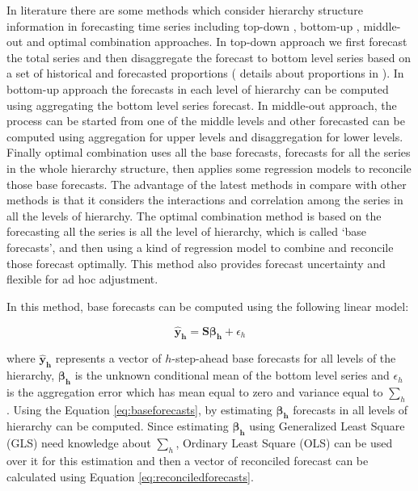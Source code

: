 \documentclass[11pt,a4paper,]{article}
\begin{document}
In literature there are some methods which consider hierarchy structure
information in forecasting time series including top-down
\autocite{gross1990disaggregation}, bottom-up
\autocite{kahn1998revisiting}, middle-out and optimal combination
\autocite{hyndman2011optima} approaches. In top-down approach we first
forecast the total series and then disaggregate the forecast to bottom
level series based on a set of historical and forecasted proportions (
details about proportions in \textcite{athanasopoulos2009hierarchical}).
In bottom-up approach the forecasts in each level of hierarchy can be
computed using aggregating the bottom level series forecast. In
middle-out approach, the process can be started from one of the middle
levels and other forecasted can be computed using aggregation for upper
levels and disaggregation for lower levels. Finally optimal combination
uses all the base forecasts, forecasts for all the series in the whole
hierarchy structure, then applies some regression models to reconcile
those base forecasts. The advantage of the latest methods in compare
with other methods is that it considers the interactions and correlation
among the series in all the levels of hierarchy. The optimal combination
method is based on the forecasting all the series is all the level of
hierarchy, which is called `base forecasts', and then using a kind of
regression model to combine and reconcile those forecast optimally. This
method also provides forecast uncertainty and flexible for ad hoc
adjustment.

In this method, base forecasts can be computed using the following
linear model:

\begin{equation}\label{eq:baseforecasts}
   \mathbf{\hat{y}_h} = \mathbf{S}\boldsymbol{\beta_h}+\epsilon_h
\end{equation}

where \(\mathbf{\hat{y}_h}\) represents a vector of \(h\)-step-ahead
base forecasts for all levels of the hierarchy, \(\boldsymbol{\beta_h}\)
is the unknown conditional mean of the bottom level series and
\(\epsilon_h\) is the aggregation error which has mean equal to zero and
variance equal to \(\sum_h\) \autocite{hyndman2016fast}. Using the
Equation \eqref{eq:baseforecasts}, by estimating \(\boldsymbol{\beta_h}\)
forecasts in all levels of hierarchy can be computed. Since estimating
\(\boldsymbol{\beta_h}\) using Generalized Least Square (GLS) need
knowledge about \(\sum_h\), Ordinary Least Square (OLS) can be used over
it for this estimation and then a vector of reconciled forecast can be
calculated using Equation \eqref{eq:reconciledforecasts}.
\end{document}
